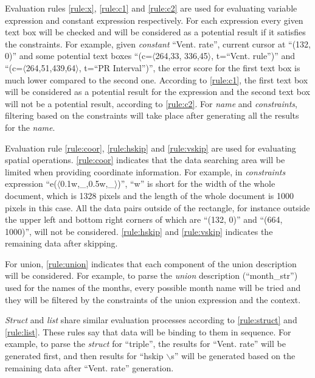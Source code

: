 Evaluation rules \ref{rule:x}, \ref{rule:c1} and \ref{rule:c2} are used
for evaluating variable expression and constant expression respectively.
For each expression every given text box will be checked and will be
considered as a potential result if it satisfies the constraints.
For example, given {\em constant} ``Vent. rate'', current cursor at ``(132, 0)'' and some potential text boxes ``(c=$\langle$264,33, 336,45$\rangle$, t=``Vcnt. rule'')'' and ``(c=$\langle$264,51,439,64$\rangle$, t=``PR Interval'')'', the error score for the first text box is much lower compared to the second one. According to \ref{rule:c1}, the first text box will be considered as a potential result
for the expression and the second text box will not be a potential result, according to \ref{rule:c2}. For {\em name} and {\em constraints}, filtering based on the constraints will take place after generating all the results for the {\em name}.

Evaluation rule \ref{rule:coor}, \ref{rule:hskip} and \ref{rule:vskip}
are used for evaluating spatial operations. \ref{rule:coor} indicates that the data searching area
will be limited when providing coordinate information.
For example, in {\em constraints} expression ``e($\langle$0.1w,\_,0.5w,\_$\rangle$)'', ``w'' is short for the
width of the whole document, which is 1328 pixels and the length of the whole document is 1000 pixels in this case. All the data pairs outside of
the rectangle, for instance outside the upper left and bottom right corners of which are ``(132, 0)'' and ``(664, 1000)'', will not be considered.
\ref{rule:hskip} and \ref{rule:vskip}
indicates the remaining data after skipping.

For union, \ref{rule:union} indicates that each component
of the union description will be considered. For example, to parse the
{\em union} description (``month\_str'') used for the names of the months,
every possible month name will be tried and they will be filtered
by the constraints of the union expression and the context.

{\em Struct} and {\em list} share
similar evaluation processes according to \ref{rule:struct} and \ref{rule:list}. These rules say
that data will be binding to them in sequence. For example, to parse the {\em struct} for ``triple'', the results for ``Vent. rate'' will be generated first, and then results for ``hskip $\backslash$s'' will be generated based on the remaining data after ``Vent. rate'' generation.


